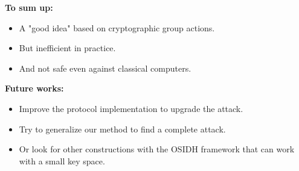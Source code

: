 \documentclass[10pt]{beamer}
\theoremstyle{plain}
\theoremstyle{definition}
\renewcommand{\(}{\left(}
\renewcommand{\)}{\right)}
\begin{document}
\begin{frame}
\textbf{To sum up:}

\vspace{0.3cm}

\begin{itemize}
\item A "good idea" based on cryptographic group actions.

\item But inefficient in practice.

\item And not safe even against classical computers.

\end{itemize}

\vspace{0.5cm}
\pause 

\textbf{Future works:}

\vspace{0.3cm}

\begin{itemize}
\item Improve the protocol implementation to upgrade the attack.

\item Try to generalize our method to find a complete attack.

\item Or look for other constructions with the OSIDH framework that can work with a small key space. 
\end{itemize}
\end{frame}
\end{document}
